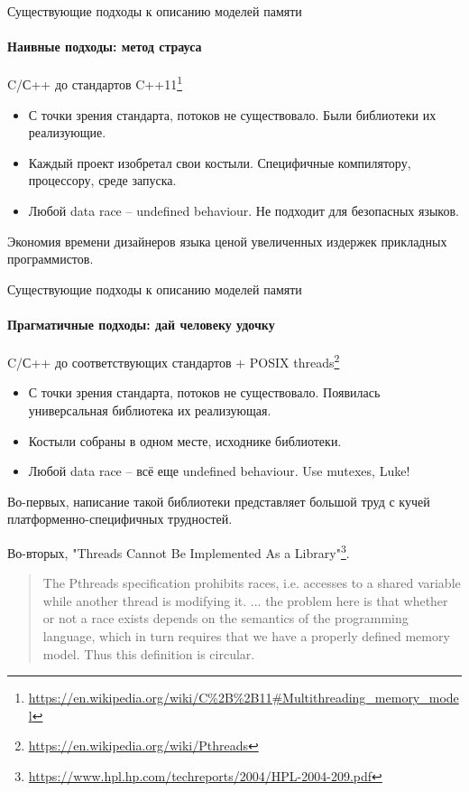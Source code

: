 \begin{frame}[t]{Существующие подходы к описанию моделей памяти}
\framesubtitle{Наивные подходы: метод страуса}

C/С++ до стандартов C++11\footnote{\tiny\url{https://en.wikipedia.org/wiki/C\%2B\%2B11#Multithreading_memory_model}}

\pause
\begin{itemize}
	\item С точки зрения стандарта, потоков не существовало. Были библиотеки их реализующие.
	\item Каждый проект изобретал свои костыли. Специфичные компилятору, процессору, среде запуска. 
	\item Любой data race -- undefined behaviour. Не подходит для безопасных языков.
\end{itemize}

\pause
Экономия времени дизайнеров языка ценой увеличенных издержек прикладных программистов.
\end{frame}


\begin{frame}[t]{Существующие подходы к описанию моделей памяти}
\framesubtitle{Прагматичные подходы: дай человеку удочку}

C/С++ до соответствующих стандартов + POSIX threads\footnote{\tiny\url{https://en.wikipedia.org/wiki/Pthreads}}
%
\pause
\begin{itemize}
	\item С точки зрения стандарта, потоков не существовало. Появилась универсальная библиотека их реализующая.
	\item Костыли собраны в одном месте, исходнике библиотеки.
	\item Любой data race -- всё еще undefined behaviour. Use mutexes, Luke!
\end{itemize}

\pause
Во-первых, написание такой библиотеки представляет большой труд с кучей платформенно-специфичных трудностей.

\pause

Во-вторых, "Threads Cannot Be Implemented As a Library"\footnote<4->{\tiny\url{https://www.hpl.hp.com/techreports/2004/HPL-2004-209.pdf}}.
\pause

\begin{quote}
 The Pthreads specification prohibits races, i.e. accesses to a shared variable while another thread is modifying it. ... the
 problem here is that whether or not a race exists depends on the semantics of the programming language, which in turn requires that we have a properly defined memory model.
 Thus this definition is circular.
\end{quote}
%
\end{frame}

